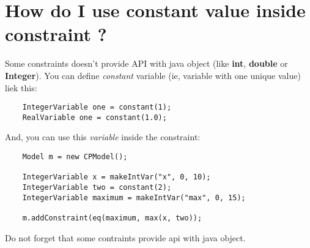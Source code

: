 \section{How do I use constant value inside constraint ?}\label{faq:howdoiuseconstantevalueinsideconstraint}\hypertarget{faq:howdoiuseconstantevalueinsideconstraint}{}
Some constraints doesn't provide API with java object (like \textbf{int}, \textbf{double} or \textbf{Integer}). 
You can define \emph{constant} variable (ie, variable with one unique value) liek this:
\begin{lstlisting}
	IntegerVariable one = constant(1);
	RealVariable one = constant(1.0);
\end{lstlisting}
And, you can use this \emph{variable} inside the constraint:
\begin{lstlisting}
	Model m = new CPModel();
	
	IntegerVariable x = makeIntVar("x", 0, 10);
	IntegerVariable two = constant(2);
	IntegerVariable maximum = makeIntVar("max", 0, 15);
	
	m.addConstraint(eq(maximum, max(x, two));
\end{lstlisting}

Do not forget that some contraints provide api with java object.

